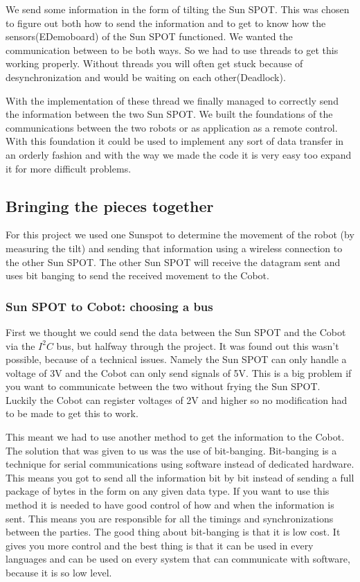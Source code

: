 \documentclass[a4paper,10pt]{article} %
\begin{document}
We send some information in the form of tilting the Sun SPOT. This was chosen
to figure out both how to send the information and to get to know how the
sensors(EDemoboard) of the Sun SPOT functioned. We wanted the communication
between to be both ways. So we had to use threads to get this working properly.
Without threads you will often get stuck because of desynchronization and would
be waiting on each other(Deadlock).

With the implementation of these thread we finally managed to correctly send
the information between the two Sun SPOT. We built the foundations of the
communications between the two robots or as application as a remote control.
With this foundation it could be used to implement any sort of data transfer in
an orderly fashion and with the way we made the code it is very easy too expand
it for more difficult problems.


\subsection{Bringing the pieces together} %
\label{subsec:Bringing the pieces together}

For this project we used one Sunspot to determine the movement of the robot (by
measuring the tilt) and sending that information using a wireless connection to
the other Sun SPOT. The other Sun SPOT will receive the datagram sent and uses
bit banging to send the received movement to the Cobot.

\subsubsection{Sun SPOT to Cobot: choosing a bus} %
\label{ssub:bitbang}

First we thought we could send the data between the Sun SPOT and the Cobot via
the $I^2C$ bus, but halfway through the project. It was found out this wasn't
possible, because of a technical issues. Namely the Sun SPOT can only handle a
voltage of 3V and the Cobot can only send signals of 5V. This is a big problem
if you want to communicate between the two without frying the Sun SPOT. Luckily
the Cobot can register voltages of 2V and higher so no modification had to be
made to get this to work.

This meant we had to use another method to get the information to the Cobot. The
solution that was given to us was the use of bit-banging. Bit-banging is a
technique for serial communications using software instead of dedicated
hardware. This means you got to send all the information bit by bit instead of
sending a full package of bytes in the form on any given data type. If you want
to use this method it is needed to have good control of how and when the
information is sent. This means you are responsible for all the timings and
synchronizations between the parties. The good thing about bit-banging is that
it is low cost. It gives you more control and the best thing is that it can be
used in every languages and can be used on every system that can communicate
with software, because it is so low level.
\end{document}
